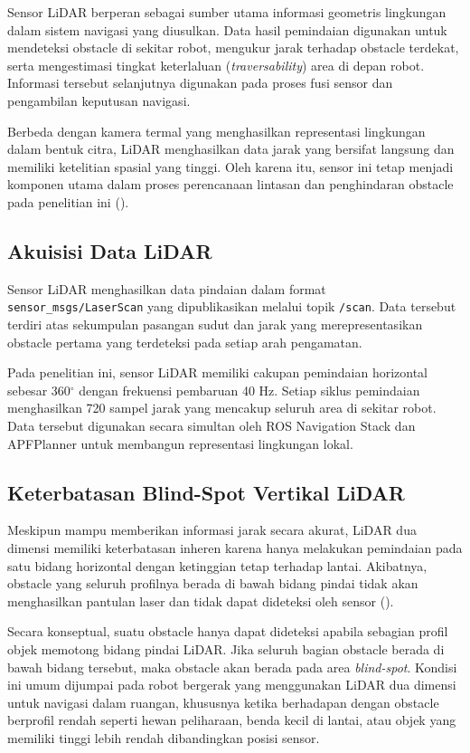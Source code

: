 Sensor LiDAR berperan sebagai sumber utama informasi geometris lingkungan dalam sistem navigasi yang diusulkan. Data hasil pemindaian digunakan untuk mendeteksi obstacle di sekitar robot, mengukur jarak terhadap obstacle terdekat, serta mengestimasi tingkat keterlaluan (\textit{traversability}) area di depan robot. Informasi tersebut selanjutnya digunakan pada proses fusi sensor dan pengambilan keputusan navigasi.

Berbeda dengan kamera termal yang menghasilkan representasi lingkungan dalam bentuk citra, LiDAR menghasilkan data jarak yang bersifat langsung dan memiliki ketelitian spasial yang tinggi. Oleh karena itu, sensor ini tetap menjadi komponen utama dalam proses perencanaan lintasan dan penghindaran obstacle pada penelitian ini (\cite{Fagundes2024,Liu2024}).

\subsection{Akuisisi Data LiDAR}

Sensor LiDAR menghasilkan data pindaian dalam format \texttt{sensor\_msgs/LaserScan} y\-ang dipublikasikan melalui topik \texttt{/scan}. Data tersebut terdiri atas sekumpulan pasangan sudut dan jarak yang merepresentasikan obstacle pertama yang terdeteksi pada setiap arah pengamatan.

Pada penelitian ini, sensor LiDAR memiliki cakupan pemindaian horizontal sebesar 360$^\circ$ dengan frekuensi pembaruan 40 Hz. Setiap siklus pemindaian menghasilkan 720 sampel jarak yang mencakup seluruh area di sekitar robot. Data tersebut digunakan secara simultan oleh ROS Navigation Stack dan APFPlanner untuk membangun representasi lingkungan lokal.

\subsection{Keterbatasan Blind-Spot Vertikal LiDAR}

Meskipun mampu memberikan informasi jarak secara akurat, LiDAR dua dimensi memiliki keterbatasan inheren karena hanya melakukan pemindaian pada satu bidang horizontal dengan ketinggian tetap terhadap lantai. Akibatnya, obstacle yang seluruh profilnya berada di bawah bidang pindai tidak akan menghasilkan pantulan laser dan tidak dapat dideteksi oleh sensor (\cite{Kibii2022,Fagundes2024}).

Secara konseptual, suatu obstacle hanya dapat dideteksi apabila sebagian profil objek memotong bidang pindai LiDAR. Jika seluruh bagian obstacle berada di bawah bidang tersebut, maka obstacle akan berada pada area \textit{blind-spot}. Kondisi ini umum dijumpai pada robot bergerak yang menggunakan LiDAR dua dimensi untuk navigasi dalam ruangan, khususnya ketika berhadapan dengan obstacle berprofil rendah seperti hewan peliharaan, benda kecil di lantai, atau objek yang memiliki tinggi lebih rendah dibandingkan posisi sensor.

